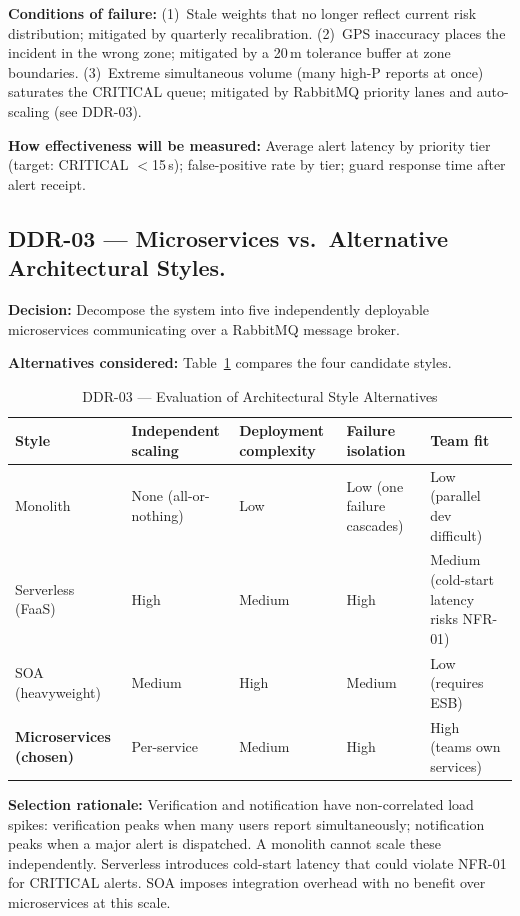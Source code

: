 \documentclass[12pt,a4paper]{article}
\begin{document}
\textbf{Conditions of failure:}
(1)~Stale weights that no longer reflect current risk distribution;
mitigated by quarterly recalibration.
(2)~GPS inaccuracy places the incident in the wrong zone;
mitigated by a 20\,m tolerance buffer at zone boundaries.
(3)~Extreme simultaneous volume (many high-P reports at once)
saturates the CRITICAL queue; mitigated by RabbitMQ priority lanes
and auto-scaling (see DDR-03).

\textbf{How effectiveness will be measured:}
Average alert latency by priority tier (target: CRITICAL $<$15\,s);
false-positive rate by tier; guard response time after alert receipt.

\subsection{DDR-03 --- Microservices vs.\ Alternative Architectural Styles.}
\label{sec:ddr03}

\textbf{Decision:} Decompose the system into five independently
deployable microservices communicating over a RabbitMQ message broker.

\textbf{Alternatives considered:}
Table~\ref{tab:ddr03} compares the four candidate styles.

\begin{table}[h]
\caption{DDR-03 --- Evaluation of Architectural Style Alternatives}
\label{tab:ddr03}
\centering
\begin{tabularx}{\textwidth}{lXXXX}
\toprule
\textbf{Style} & \textbf{Independent scaling} & \textbf{Deployment complexity} & \textbf{Failure isolation} & \textbf{Team fit} \\
\midrule
Monolith & None (all-or-nothing) & Low & Low (one failure cascades) & Low (parallel dev difficult) \\
Serverless (FaaS) & High & Medium & High & Medium (cold-start latency risks NFR-01) \\
SOA (heavyweight) & Medium & High & Medium & Low (requires ESB) \\
\textbf{Microservices (chosen)} & Per-service & Medium & High & High (teams own services) \\
\bottomrule
\end{tabularx}
\end{table}

\textbf{Selection rationale:}
Verification and notification have non-correlated load spikes:
verification peaks when many users report simultaneously; notification
peaks when a major alert is dispatched. A monolith cannot scale these
independently. Serverless introduces cold-start latency that could
violate NFR-01 for CRITICAL alerts. SOA imposes integration overhead
with no benefit over microservices at this scale.
\end{document}
